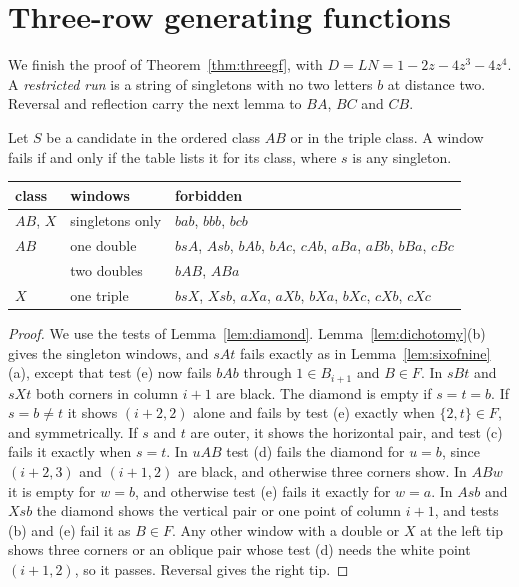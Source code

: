 \section{Three-row generating functions}\label{app:threegf}

We finish the proof of Theorem~\ref{thm:threegf}, with $D=LN=1-2z-4z^3-4z^4$. A
\emph{restricted run} is a string of singletons with no two letters $b$ at distance two.
Reversal and reflection carry the next lemma to $BA$, $BC$ and $CB$.

\begin{lemma}\label{lem:threewindows}
Let $S$ be a candidate in the ordered class $AB$ or in the triple class. A window fails if
and only if the table lists it for its class, where $s$ is any singleton.
\begin{center}\small
\begin{tabular}{@{}lll@{}}
\toprule
class & windows & forbidden \\
\midrule
$AB$, $X$ & singletons only & $bab$, $bbb$, $bcb$ \\
$AB$ & one double & $bsA$, $Asb$, $bAb$, $bAc$, $cAb$, $aBa$, $aBb$, $bBa$, $cBc$ \\
 & two doubles & $bAB$, $ABa$ \\
$X$ & one triple & $bsX$, $Xsb$, $aXa$, $aXb$, $bXa$, $bXc$, $cXb$, $cXc$ \\
\bottomrule
\end{tabular}
\end{center}
\end{lemma}

\begin{proof}
We use the tests of Lemma~\ref{lem:diamond}. Lemma~\ref{lem:dichotomy}(b) gives the singleton
windows, and $sAt$ fails exactly as in Lemma~\ref{lem:sixofnine}(a), except that test (e) now
fails $bAb$ through $1\in B_{i+1}$ and $B\in F$. In $sBt$ and $sXt$ both corners in column $i+1$
are black. The diamond is empty if $s=t=b$. If $s=b\ne t$ it shows $(i+2,2)$ alone and fails by
test (e) exactly when $\{2,t\}\in F$, and symmetrically. If $s$ and $t$ are outer, it shows the
horizontal pair, and test (c) fails it exactly when $s=t$. In $uAB$ test (d) fails the diamond for
$u=b$, since $(i+2,3)$ and $(i+1,2)$ are black, and otherwise three corners show. In $ABw$ it is empty for $w=b$, and otherwise test (e)
fails it exactly for $w=a$. In $Asb$ and $Xsb$ the diamond shows the vertical pair or one point of column $i+1$, and tests (b) and (e) fail it as $B\in F$. Any other window with a
double or $X$ at the left tip shows three corners or an oblique pair whose test (d) needs the
white point $(i+1,2)$, so it passes. Reversal gives the right tip.
\end{proof}

